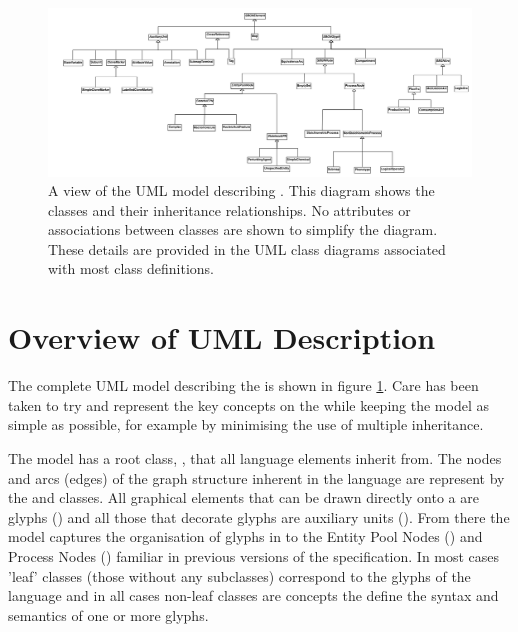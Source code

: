 \begin{figure}
\includegraphics[width=\textheight]{images/sbgnumloverview}
\caption{A view of the UML model describing \PDl. This diagram shows
  the classes and their inheritance relationships. No attributes or
  associations between classes are shown to simplify the
  diagram. These details are provided in the UML class diagrams
  associated with most class definitions.}
\label{fig:techref:sbgnoverviewuml}
\end{figure}

\section{Overview of UML Description}

The complete UML model describing the \PDl is shown in figure
\ref{fig:techref:sbgnoverviewuml}. Care has been taken to try and
represent the key concepts on the \PDl while keeping the model as
simple as possible, for example by minimising the use of multiple
inheritance.

The model has a root class, , that all language
elements inherit from. The nodes and arcs (edges) of the graph
structure inherent in the language are represent by the
 and  classes. All graphical
elements that can be drawn directly onto a \PDm are glyphs
() and all those that decorate glyphs are
auxiliary units (). From there the model
captures the organisation of glyphs in to the Entity Pool Nodes
() and Process Nodes
() familiar in previous versions of the \PDl
specification.  In most cases 'leaf' classes (those without any
subclasses) correspond to the glyphs of the language and in all cases
non-leaf classes are concepts the define the syntax and semantics of
one or more glyphs.

